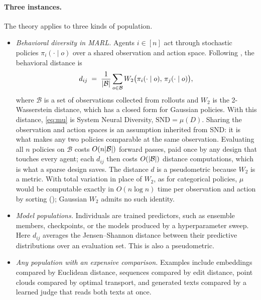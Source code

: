 \documentclass[twoside,11pt]{article}
\DeclarePairedDelimiter{\abs}{\lvert}{\rvert}
\newcommand{\SND}{\mu}
\begin{document}
\paragraph{Three instances.} The theory applies to three kinds of population.
\begin{itemize}
  \item \emph{Behavioral diversity in MARL.} Agents $i\in[n]$ act through
  stochastic policies ${\pi_i(\cdot\mid o)}$ over a shared observation and
  action space. Following \citet{bettini2025snd}, the behavioral distance
  is
  \begin{equation}
    d_{ij} \;=\; \frac{1}{\abs{\mathcal{B}}}\sum_{o\in\mathcal{B}}
    W_2\bigl(\pi_i(\cdot\mid o),\,\pi_j(\cdot\mid o)\bigr),
    \label{eq:snd-distance}
  \end{equation}
  where $\mathcal{B}$ is a set of observations collected from rollouts and
  $W_2$ is the 2-Wasserstein distance, which has a closed form for Gaussian
  policies. With this distance, \eqref{eq:mu} is System Neural Diversity,
  $\mathrm{SND}=\SND(D)$. Sharing the observation and action spaces is an
  assumption inherited from SND: it is what makes any two policies
  comparable at the same observation. Evaluating all $n$ policies on
  $\mathcal{B}$ costs $O(n\abs{\mathcal{B}})$ forward passes, paid once by
  any design that touches every agent; each $d_{ij}$ then costs
  $O(\abs{\mathcal{B}})$ distance computations, which is what a sparse
  design saves. The distance $d$ is a pseudometric because $W_2$ is a metric. With
  total variation in place of $W_2$, as for categorical policies, $\SND$
  would be computable exactly in $O(n\log n)$ time per observation and
  action by sorting (); Gaussian $W_2$ admits no such
  identity.
  \item \emph{Model populations.} Individuals are trained predictors, such
  as ensemble members, checkpoints, or the models produced by a hyperparameter sweep.
  Here $d_{ij}$ averages the Jensen--Shannon distance between their predictive
  distributions over an evaluation set. This is also a pseudometric.
  \item \emph{Any population with an expensive comparison.} Examples include
  embeddings compared by Euclidean distance, sequences compared by edit
  distance, point clouds compared by optimal transport, and generated texts
  compared by a learned judge that reads both texts at once.
\end{itemize}
\end{document}
